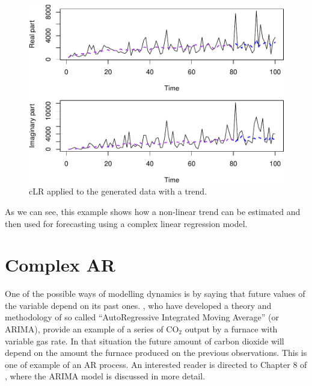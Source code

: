 \documentclass[
]{book}
\begin{document}
\begin{figure}
\centering
\includegraphics{Svetunkov---Svetunkov---Complex-Valued-Econometrics_files/figure-latex/dataWithTrendForecast-1.pdf}
\caption{\label{fig:dataWithTrendForecast}cLR applied to the generated data with a trend.}
\end{figure}

As we can see, this example shows how a non-linear trend can be estimated and then used for forecasting using a complex linear regression model.

\hypertarget{complex-ar}{%
\section{Complex AR}\label{complex-ar}}

One of the possible ways of modelling dynamics is by saying that future values of the variable depend on its past ones. \citet{Box1976}, who have developed a theory and methodology of so called ``AutoRegressive Integrated Moving Average'' (or ARIMA), provide an example of a series of CO\(_2\) output by a furnace with variable gas rate. In that situation the future amount of carbon dioxide will depend on the amount the furnace produced on the previous observations. This is one of example of an AR process. An interested reader is directed to Chapter 8 of \citet{SvetunkovAdam}, where the ARIMA model is discussed in more detail.
\end{document}
